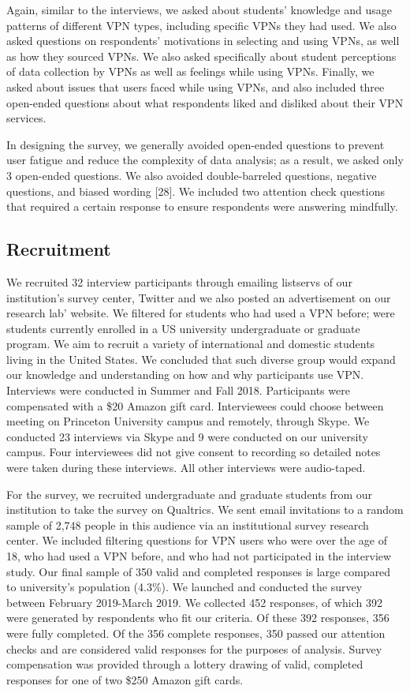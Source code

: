 Again, similar to the interviews, we asked about students’
knowledge and usage patterns of different VPN types, including specific VPNs
they had used. We also asked questions on respondents’ motivations in
selecting and using VPNs, as well as how they sourced VPNs. We also asked specifically 
about student perceptions of data collection by VPNs as well as feelings while
using VPNs. Finally, we asked about issues that
users faced while using VPNs, and also included three open-ended questions about
what respondents liked and disliked about their VPN services.

In designing the survey, we generally avoided open-ended questions to prevent
user fatigue and reduce the complexity of data analysis; as a result, we asked
only 3 open-ended questions. We also avoided double-barreled questions,
negative questions, and biased wording [28]. We included two attention check
questions that required a certain response to ensure respondents were answering mindfully. 

\subsection{Recruitment} We recruited 32 interview participants through
emailing listservs of our institution's survey center, Twitter and we also
posted an advertisement on  our research lab' website. We filtered for students who had used a VPN before; were students currently enrolled in a US university undergraduate or graduate program.  We aim to recruit a variety of international and domestic students living in the United States.
We concluded that such diverse group would expand our knowledge and
understanding on how and why participants use VPN. Interviews were conducted in Summer and Fall 2018. Participants were compensated with a \$20 Amazon gift card.  Interviewees
could choose between meeting on Princeton University campus and remotely,
through Skype. We conducted 23 interviews via Skype and 9 were conducted on our university campus.  Four interviewees did not give consent to
recording so detailed notes were taken during these interviews. All other interviews were audio-taped.

For the survey, we recruited undergraduate and
graduate students from our institution to take the survey on Qualtrics. We sent email invitations to a random sample of 2,748 people in this
audience via an institutional survey research center. We included filtering questions for VPN users who were
over the age of 18, who had used a VPN before, and who had not participated in the interview study. Our
final sample of 350 valid and completed responses is large compared to
university's population (4.3\%). We launched and conducted the survey between February 2019-March 2019. We collected 452 responses, of which 392 were generated by
respondents who fit our criteria. Of these 392 responses, 356 were fully
completed. Of the 356 complete responses, 350 passed our attention checks and
are considered valid responses for the purposes of analysis. Survey compensation was provided through a lottery drawing of valid, completed
responses for one of two \$250 Amazon gift cards.

